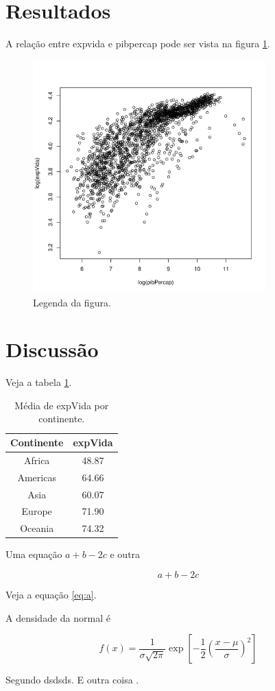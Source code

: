 \documentclass[a4paper]{article}
\begin{document}
\section{Resultados}

A relação entre expvida e pibpercap pode ser vista na figura \ref{fig:plot}.

\begin{figure}[h]
\centering
\includegraphics[width=0.8\textwidth]{figura1.pdf}
\caption{Legenda da figura.}
\label{fig:plot}
\end{figure}

\section{Discussão}

Veja a tabela \ref{tab:medias}.

\begin{table}[h]
\caption{Média de expVida por continente.}
\label{tab:medias}
\centering
\begin{tabular}{cc}
\hline
Continente & expVida \\
\hline
Africa & 48.87 \\
Americas & 64.66 \\
Asia & 60.07 \\
Europe & 71.90 \\
Oceania & 74.32 \\
\hline
\end{tabular}
\end{table}

Uma equação $a+b-2c$ e outra

\begin{equation}
\label{eq:a}
a+b-2c
\end{equation}

Veja a equação \ref{eq:a}.

A densidade da normal é

\begin{equation}
f(x) = \frac{1}{\sigma \sqrt{2\pi}} \exp{ \left[ -\frac{1}{2}
    \left( \frac{x - \mu}{\sigma} \right)^2 \right] }
\end{equation}


Segundo \citet{Buckland2004} dsdsds. E outra coisa \citep{Durbin1997}.



\end{document}

